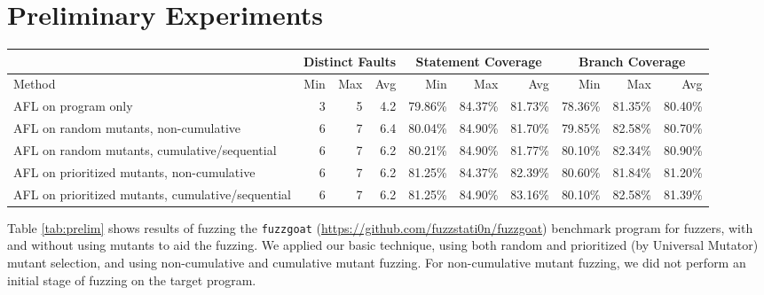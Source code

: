 \section{Preliminary Experiments}

\begin{table*}[t]
  \renewcommand{\arraystretch}{1.3}
\label{tab:prelim}
\caption{Results for preliminary experiments}
  
  \centering
  \begin{tabular}{l||r|r|r||r|r|r||r|r|r}
    & \multicolumn{3}{|c||}{Distinct Faults} & \multicolumn{3}{|c||}{Statement Coverage} &
                                                                    \multicolumn{3}{|c}{Branch Coverage} \\
    \hline
  Method & Min & Max  & Avg & Min & Max & Avg
                                                                  
  & Min & Max & Avg \\
    \hline
    \hline
  AFL on program only & 3 & 5 & 4.2 & 79.86\% & 84.37\% & 81.73\% &
                                                                    78.36\%
                                  & 81.35\% & 80.40\%\\
    \hline
    \hline
  AFL on random mutants, non-cumulative  & 6 & 7 & 6.4 & 80.04\% &
                                                                   84.90\%
                      & 81.70\% & 79.85\% & 82.58\% & 80.70\%\\
  \hline
  AFL on random mutants, cumulative/sequential & 6 & 7 & 6.2 & 80.21\%
                                                               &
                                                                 84.90\%
                      & 81.77\%
                            & 80.10\% & 82.34\% & 80.90\%\\
    \hline
    \hline
    AFL on prioritized mutants, non-cumulative  & 6 & 7 & 6.2 &
                                                                81.25\%
               & 84.37\% & 82.39\% & 80.60\% & 81.84\% & 81.20\% \\
    \hline
    AFL on prioritized mutants, cumulative/sequential  & 6 & 7 & 6.2 &
    81.25\% & 84.90\% & 83.16\% & 80.10\% & 82.58\% & 81.39\%\\    
  \hline
  \end{tabular}
\end{table*}

Table \ref{tab:prelim} shows results of fuzzing the {\tt fuzzgoat}
(\url{https://github.com/fuzzstati0n/fuzzgoat}) benchmark program for
fuzzers, with and without using mutants to aid the fuzzing.  We
applied our basic technique, using both random and prioritized (by
Universal Mutator) mutant selection, and using non-cumulative and
cumulative mutant fuzzing.  For non-cumulative mutant fuzzing, we did
not perform an initial stage of fuzzing on the target program.



